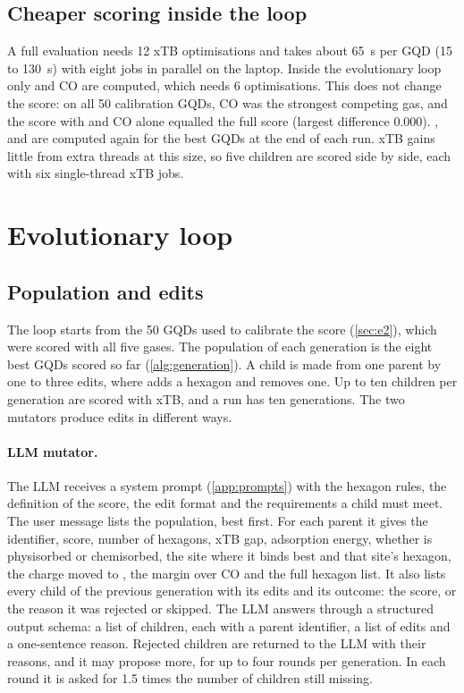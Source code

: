 \subsection{Cheaper scoring inside the loop}

A full evaluation needs 12 xTB optimisations and takes about 65~s per GQD (15 to 130~s) with
eight jobs in parallel on the laptop. Inside the evolutionary loop only  and CO are
computed, which needs 6 optimisations. This does not change the score: on all 50 calibration GQDs,
CO was the strongest competing gas, and the score with  and CO alone equalled the full
score (largest difference 0.000). ,  and  are computed again for the best
GQDs at the end of each run. xTB gains little from extra threads at this size, so five children are
scored side by side, each with six single-thread xTB jobs.

\section{Evolutionary loop}
\label{sec:loop}

\subsection{Population and edits}

The loop starts from the 50 GQDs used to calibrate the score (\cref{sec:e2}), which were scored
with all five gases. The population of each generation is the eight best GQDs scored so far
(\cref{alg:generation}). A child is made from one parent by one to three edits, where
 adds a hexagon and  removes one. Up to ten children per
generation are scored with xTB, and a run has ten generations. The two mutators produce edits in
different ways.

\paragraph{LLM mutator.} The LLM receives a system prompt (\cref{app:prompts}) with the hexagon
rules, the definition of the score, the edit format and the requirements a child must meet. The
user message lists the population, best first. For each parent it gives the identifier, score,
number of hexagons, xTB gap,  adsorption energy, whether  is physisorbed or
chemisorbed, the site where it binds best and that site's hexagon, the charge moved to ,
the margin over CO and the full hexagon list. It also lists every child of the previous generation
with its edits and its outcome: the score, or the reason it was rejected or skipped. The LLM
answers through a structured output schema: a list of children, each with a parent identifier, a
list of edits and a one-sentence reason. Rejected children are returned to the LLM with their
reasons, and it may propose more, for up to four rounds per generation. In each round it is asked
for 1.5 times the number of children still missing.

